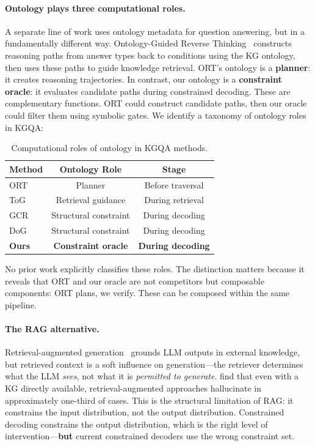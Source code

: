 \documentclass[11pt,twoside]{article}
\begin{document}
\paragraph{Ontology plays three computational roles.} A separate line of work uses ontology metadata for question answering, but in a fundamentally different way. Ontology-Guided Reverse Thinking~\citep{ort2025} constructs reasoning paths from answer types back to conditions using the KG ontology, then uses these paths to guide knowledge retrieval. ORT's ontology is a \textbf{planner}: it creates reasoning trajectories. In contrast, our ontology is a \textbf{constraint oracle}: it evaluates candidate paths during constrained decoding. These are complementary functions. ORT could construct candidate paths, then our oracle could filter them using symbolic gates. We identify a taxonomy of ontology roles in KGQA:

\begin{table}[H]
	\centering
	\caption{Computational roles of ontology in KGQA methods.}
	\label{tab:ontology-roles}
	\begin{tabular}{lcc}
		\toprule
		\textbf{Method}       & \textbf{Ontology Role}    & \textbf{Stage}           \\
		\midrule
		ORT~\citep{ort2025}           & Planner                    & Before traversal         \\
		ToG~\citep{sun2024tog}        & Retrieval guidance         & During retrieval         \\
		GCR~\citep{luo2025-graph-constrained-reasoning} & Structural constraint & During decoding \\
		DoG~\citep{li2024-decoding-on-graphs} & Structural constraint & During decoding \\
		\textbf{Ours}          & \textbf{Constraint oracle} & \textbf{During decoding} \\
		\bottomrule
	\end{tabular}
\end{table}

No prior work explicitly classifies these roles. The distinction matters because it reveals that ORT and our oracle are not competitors but composable components: ORT plans, we verify. These can be composed within the same pipeline.

\paragraph{The RAG alternative.} Retrieval-augmented generation~\citep{lewis2020rag} grounds LLM outputs in external knowledge, but retrieved context is a soft influence on generation---the retriever determines what the LLM \textit{sees}, not what it is \textit{permitted to generate}. \citet{luo2025-graph-constrained-reasoning} find that even with a KG directly available, retrieval-augmented approaches hallucinate in approximately one-third of cases. This is the structural limitation of RAG: it constrains the input distribution, not the output distribution. Constrained decoding constrains the output distribution, which is the right level of intervention---\textbf{but} current constrained decoders use the wrong constraint set.
\end{document}
